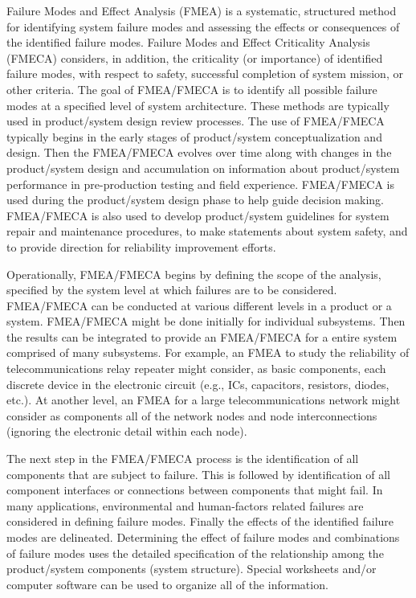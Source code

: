 Failure Modes and Effect Analysis (FMEA) is a systematic, structured
method for identifying system failure modes and assessing the effects
or consequences of the identified failure modes.  Failure Modes and
Effect Criticality Analysis (FMECA) considers, in addition, the
criticality (or importance) of identified failure modes, with respect
to safety, successful completion of system mission, or other
criteria.  The goal of FMEA/FMECA is to identify all possible failure
modes at a specified level of system architecture. These methods are
typically used in product/system design review processes.  The use of
FMEA/FMECA typically begins in the early stages of product/system
conceptualization and design.  Then the FMEA/FMECA evolves over time
along with changes in the product/system design and accumulation on
information about product/system performance in pre-production
testing and field experience. FMEA/FMECA is used during the
product/system design phase to help guide decision making. FMEA/FMECA
is also used to develop product/system guidelines for system repair
and maintenance procedures, to make statements about system safety,
and to provide direction for reliability improvement efforts.

Operationally, FMEA/FMECA begins by defining the scope of the
analysis, specified by the system level at which failures are to be
considered.  FMEA/FMECA can be conducted at various different levels
in a product or a system. FMEA/FMECA might be done
initially for individual subsystems.  Then the results can be
integrated to provide an FMEA/FMECA for a entire system comprised of
many subsystems. For example, an FMEA to study the reliability of
telecommunications relay repeater might consider, as basic
components, each discrete device in the electronic circuit (e.g.,
ICs, capacitors, resistors, diodes, etc.).  At another level, an FMEA
for a large telecommunications network might consider as components
all of the network nodes and node interconnections (ignoring the
electronic detail within each node). 

The next step in the FMEA/FMECA process is the identification of all
components that are subject to failure.  This is followed by
identification of all component interfaces or connections between
components that might fail. In many applications, environmental and
human-factors related failures are considered in defining failure
modes. Finally the effects of the identified failure modes are
delineated. Determining the effect of failure modes and combinations
of failure modes uses the detailed specification of the relationship
among the product/system components (system structure). Special
worksheets and/or computer software can be used to organize all of
the information. 

